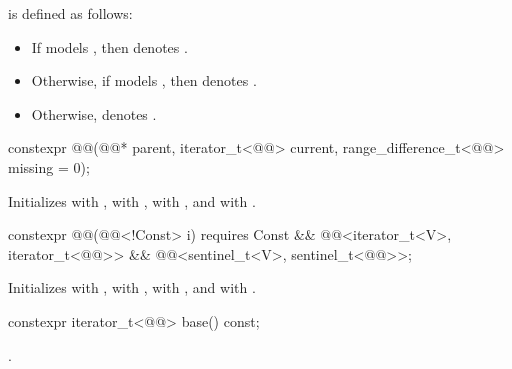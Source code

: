 \pnum
{} is defined as follows:
\begin{itemize}
\item
If  models ,
then  denotes .
\item
Otherwise, if  models ,
then  denotes .
\item
Otherwise,  denotes .
\end{itemize}

\begin{itemdecl}
constexpr @@(@@* parent, iterator_t<@@> current,
                   range_difference_t<@@> missing = 0);
\end{itemdecl}

\begin{itemdescr}
\pnum
\effects
Initializes  with ,
 with ,
 with , and
 with .
\end{itemdescr}

\begin{itemdecl}
constexpr @@(@@<!Const> i)
  requires Const && @@<iterator_t<V>, iterator_t<@@>>
                 && @@<sentinel_t<V>, sentinel_t<@@>>;
\end{itemdecl}

\begin{itemdescr}
\pnum
\effects
Initializes  with ,
 with ,
 with , and
 with .
\end{itemdescr}

\begin{itemdecl}
constexpr iterator_t<@@> base() const;
\end{itemdecl}

\begin{itemdescr}
\pnum
\returns
{}.
\end{itemdescr}

